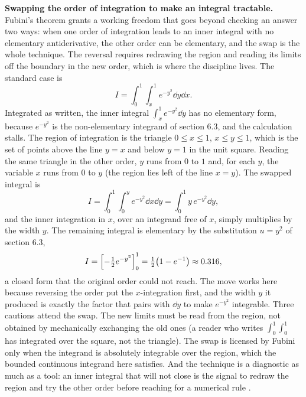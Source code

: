 

\begin{mastery}
\textbf{Swapping the order of integration to make an integral tractable.}
Fubini's theorem grants a working freedom that goes beyond checking an
answer two ways: when one order of integration leads to an inner integral
with no elementary antiderivative, the other order can be elementary, and
the swap is the whole technique. The reversal requires redrawing the
region and reading its limits off the boundary in the new order, which is
where the discipline lives. The standard case is
\[
I = \int_{0}^{1}\!\int_{x}^{1} e^{-y^{2}}\dd y\dd x.
\]
Integrated as written, the inner integral $\int_{x}^{1} e^{-y^{2}}\dd y$
has no elementary form, because $e^{-y^{2}}$ is the non-elementary
integrand of section 6.3, and the calculation stalls. The region of
integration is the triangle $0 \leq x \leq 1$, $x \leq y \leq 1$, which is
the set of points above the line $y = x$ and below $y = 1$ in the unit
square. Reading the same triangle in the other order, $y$ runs from $0$ to
$1$ and, for each $y$, the variable $x$ runs from $0$ to $y$ (the region
lies left of the line $x = y$). The swapped integral is
\[
I = \int_{0}^{1}\!\int_{0}^{y} e^{-y^{2}}\dd x\dd y =
\int_{0}^{1} y\,e^{-y^{2}}\dd y,
\]
and the inner integration in $x$, over an integrand free of $x$, simply
multiplies by the width $y$. The remaining integral is elementary by the
substitution $u = y^{2}$ of section 6.3,
\[
I = \Bigl[-\tfrac{1}{2}e^{-y^{2}}\Bigr]_{0}^{1} =
\tfrac{1}{2}\bigl(1 - e^{-1}\bigr) \approx 0.316,
\]
a closed form that the original order could not reach. The move works here
because reversing the order put the $x$-integration first, and the width
$y$ it produced is exactly the factor that pairs with $\dd y$ to make
$e^{-y^{2}}$ integrable. Three cautions attend the swap. The new limits
must be read from the region, not obtained by mechanically exchanging the
old ones (a reader who writes $\int_{0}^{1}\int_{0}^{1}$ has integrated
over the square, not the triangle). The swap is licensed by Fubini only
when the integrand is absolutely integrable over the region, which the
bounded continuous integrand here satisfies. And the technique is a
diagnostic as much as a tool: an inner integral that will not close is the
signal to redraw the region and try the other order before reaching for a
numerical rule \cite{text:v2ch06-apostol-calculus}.
\end{mastery}


